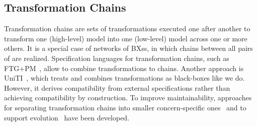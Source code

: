 \subsection*{Transformation Chains}
Transformation chains
are sets of transformations executed one after another to transform one (high-level) model into one (low-level) model across one or more others. %
It is a special case of networks of \acp{BX}s, in which chains between all pairs of \metamodels are realized. %
Specification languages for transformation chains, such as FTG+PM~\cite{lucio2013a}, allow to combine transformations to chains.
Another approach is UniTI~\cite{vanhooff2006a, vanhooff2007a, pilgrim2008a}, 
which treats and combines transformations as black-boxes like we do. 
However, it derives compatibility from external specifications rather than achieving compatibility by construction.
To improve maintainability, approaches for separating transformation chains into smaller concern-specific ones~\cite{yie2012a} and to support evolution~\cite{yie2009a} have been developed.


